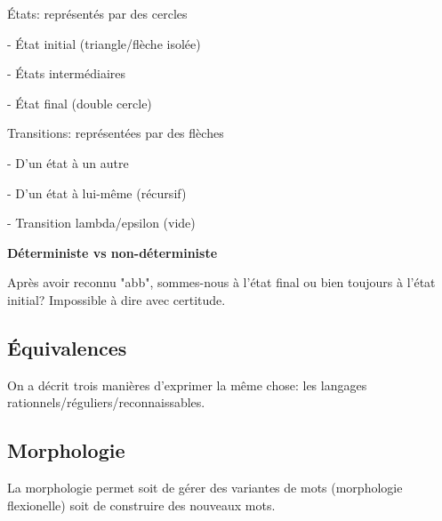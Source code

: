 \begin{minipage}[t]{0.6\textwidth}
États: représentés par des cercles

- État initial (triangle/flèche isolée)

- États intermédiaires

- État final (double cercle)\\
\end{minipage}
\begin{minipage}[t]{0.8\textwidth}
Transitions: représentées par des flèches

- D'un état à un autre

- D'un état à lui-même (récursif)

- Transition lambda/epsilon (vide)\\
\end{minipage}

\begin{center}
\resizebox{0.6\textwidth}{!}{
    
}
\end{center}

\textbf{Déterministe vs non-déterministe}

Après avoir reconnu "abb", sommes-nous à l'état final ou bien toujours à l'état initial? Impossible à dire avec certitude.

\begin{center}
\resizebox{\textwidth}{!}{
    
}
\end{center}

\newpage

\subsection{Équivalences}

On a décrit trois manières d'exprimer la même chose: les langages rationnels/réguliers/reconnaissables.

\begin{center}
\resizebox{0.6\textwidth}{!}{
    
}
\end{center}

\subsection{Morphologie}

La morphologie permet soit de gérer des variantes de mots (morphologie flexionelle) soit de construire des nouveaux mots. \\

